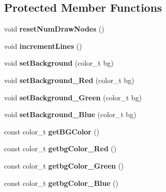 \subsection*{Protected Member Functions}
\begin{DoxyCompactItemize}
\item 
\hypertarget{class_canvas_a6740306cd9f07901b2bc31c2d4bbc3a3}{void {\bfseries reset\-Num\-Draw\-Nodes} ()}\label{class_canvas_a6740306cd9f07901b2bc31c2d4bbc3a3}

\item 
\hypertarget{class_canvas_a9381d59bc23a115890fda270eecc69f1}{void {\bfseries increment\-Lines} ()}\label{class_canvas_a9381d59bc23a115890fda270eecc69f1}

\item 
\hypertarget{class_canvas_a0227884bab636ac95308b239c99f3466}{void {\bfseries set\-Background} (color\-\_\-t bg)}\label{class_canvas_a0227884bab636ac95308b239c99f3466}

\item 
\hypertarget{class_canvas_abf204df96ee5233c09817245942a52f5}{void {\bfseries set\-Background\-\_\-\-Red} (color\-\_\-t bg)}\label{class_canvas_abf204df96ee5233c09817245942a52f5}

\item 
\hypertarget{class_canvas_aacbfeb32c1611636b937d9eddc6042f0}{void {\bfseries set\-Background\-\_\-\-Green} (color\-\_\-t bg)}\label{class_canvas_aacbfeb32c1611636b937d9eddc6042f0}

\item 
\hypertarget{class_canvas_a447151f796bafcbd3cbbc5191d98aa40}{void {\bfseries set\-Background\-\_\-\-Blue} (color\-\_\-t bg)}\label{class_canvas_a447151f796bafcbd3cbbc5191d98aa40}

\item 
\hypertarget{class_canvas_a24ccd2a00993f23addb6b29080a9733a}{const color\-\_\-t {\bfseries get\-B\-G\-Color} ()}\label{class_canvas_a24ccd2a00993f23addb6b29080a9733a}

\item 
\hypertarget{class_canvas_a71cfe236e024ae60ac8941cca8f1eb7a}{const color\-\_\-t {\bfseries getbg\-Color\-\_\-\-Red} ()}\label{class_canvas_a71cfe236e024ae60ac8941cca8f1eb7a}

\item 
\hypertarget{class_canvas_a8d10f424606d7ac03bdb1197bd23742c}{const color\-\_\-t {\bfseries getbg\-Color\-\_\-\-Green} ()}\label{class_canvas_a8d10f424606d7ac03bdb1197bd23742c}

\item 
\hypertarget{class_canvas_a62e8cb7b9c0a99b64adda7ff5330e5a2}{const color\-\_\-t {\bfseries getbg\-Color\-\_\-\-Blue} ()}\label{class_canvas_a62e8cb7b9c0a99b64adda7ff5330e5a2}


\end{DoxyCompactItemize}
